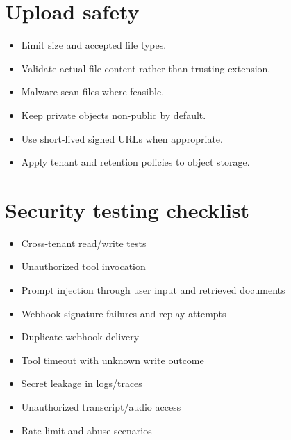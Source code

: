 \section{Upload safety}

\begin{itemize}
\item Limit size and accepted file types.
\item Validate actual file content rather than trusting extension.
\item Malware-scan files where feasible.
\item Keep private objects non-public by default.
\item Use short-lived signed URLs when appropriate.
\item Apply tenant and retention policies to object storage.
\end{itemize}
\section{Security testing checklist}

\begin{itemize}
\item Cross-tenant read/write tests
\item Unauthorized tool invocation
\item Prompt injection through user input and retrieved documents
\item Webhook signature failures and replay attempts
\item Duplicate webhook delivery
\item Tool timeout with unknown write outcome
\item Secret leakage in logs/traces
\item Unauthorized transcript/audio access
\item Rate-limit and abuse scenarios
\end{itemize}
